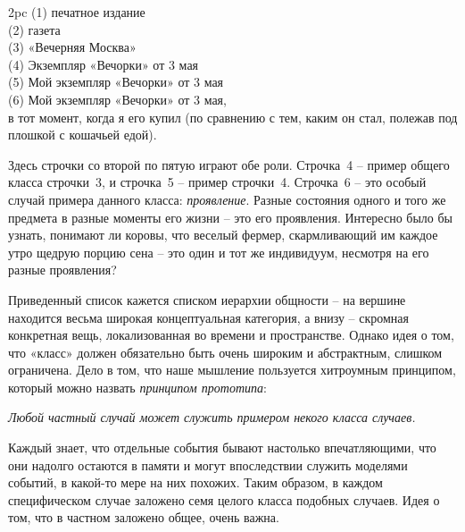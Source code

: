 \documentclass[../main.tex]{subfiles}
\begin{document}
\smallskip
\noindent{}
    2pc \dimexpr\linewidth-2pc\relax
    3pc \dimexpr\linewidth-3pc\relax
    4pc \dimexpr\linewidth-4pc\relax
    5pc \dimexpr\linewidth-5pc\relax
    6pc \dimexpr\linewidth-6pc\relax
    7pc \dimexpr\linewidth-7pc\relax
    8pc \dimexpr\linewidth-8pc\relax
    9pc \dimexpr\linewidth-9pc\relax
    10pc\dimexpr\linewidth-10pc\relax
(1) печатное издание \\
(2) газета \\
(3) «Вечерняя Москва» \\
(4) Экземпляр «Вечорки» от 3 мая \\
(5) Мой экземпляр «Вечорки» от 3 мая \\
(6) Мой экземпляр «Вечорки» от 3 мая, \\
    в тот момент, когда я его купил (по сравнению с тем, каким он стал, полежав под плошкой с кошачьей едой).
\smallskip

Здесь строчки со второй по пятую играют обе роли. Строчка~4 \--- пример общего класса строчки~3, и строчка~5 \--- пример строчки~4. Строчка~6 \--- это особый случай примера данного класса: \emph{проявление}. Разные состояния одного и того же предмета в разные моменты его жизни \--- это его проявления. Интересно было бы узнать, понимают ли коровы, что веселый фермер, скармливающий им каждое утро щедрую порцию сена \--- это один и тот же индивидуум, несмотря на его разные проявления?

Приведенный список кажется списком иерархии общности \--- на вершине находится весьма широкая концептуальная категория, а внизу \--- скромная конкретная вещь, локализованная во времени и пространстве. Однако идея о том, что «класс» должен обязательно быть очень широким и абстрактным, слишком ограничена. Дело в том, что наше мышление пользуется хитроумным принципом, который можно назвать \emph{принципом прототипа}:
\begin{center}
    \emph{Любой частный случай может служить примером некого класса случаев.}
\end{center}

Каждый знает, что отдельные события бывают настолько впечатляющими, что они надолго остаются в памяти и могут впоследствии служить моделями событий, в какой-то мере на них похожих. Таким образом, в каждом специфическом случае заложено семя целого класса подобных случаев. Идея о том, что в частном заложено общее, очень важна.
\end{document}
